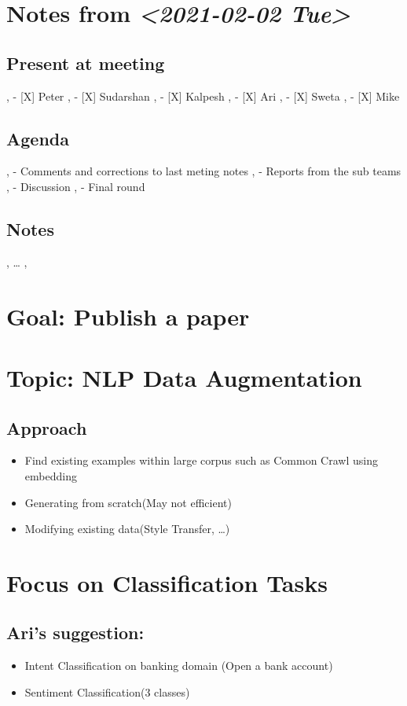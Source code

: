 \documentclass[11pt]{article}
\author{DESKTOP-VOO1MVE}
\date{\today}
\title{}
\begin{document}
\tableofcontents


\section{Notes from \textit{<2021-02-02 Tue>}}
\label{sec:org73b79a1}
\subsection{Present at meeting}
\label{sec:orgd7b5d68}
,   - [X] Peter
,   - [X] Sudarshan
,   - [X] Kalpesh
,   - [X] Ari
,   - [X] Sweta
,   - [X] Mike

\subsection{Agenda}
\label{sec:org775534e}
,   - Comments and corrections to last meting notes
,   - Reports from the sub teams
,   - Discussion
,   - Final round
\subsection{Notes}
\label{sec:orgbdf7fde}
,   \ldots{}
, 



\section{Goal: Publish a paper}
\label{sec:orgc2e43cb}
\section{Topic: NLP Data Augmentation}
\label{sec:orgf1c8e34}
\subsection{Approach}
\label{sec:org8a4d7f1}
\begin{itemize}
\item Find existing examples within large corpus such as Common Crawl using embedding
\item Generating from scratch(May not efficient)
\item Modifying existing data(Style Transfer, …)
\end{itemize}

\section{Focus on Classification Tasks}
\label{sec:org2bd142d}
\subsection{Ari's suggestion:}
\label{sec:orga1e349c}
\begin{itemize}
\item Intent Classification on banking domain (Open a bank account)
\item Sentiment Classification(3 classes)
\end{itemize}
\end{document}
